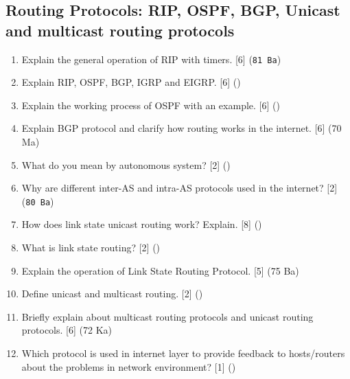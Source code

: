 \documentclass[12pt]{article}
\begin{document}
	\subsection{Routing Protocols: RIP, OSPF, BGP, Unicast and multicast routing protocols}
		\begin{enumerate}[noitemsep, topsep=0pt]
			\item Explain the general operation of RIP with timers. \hfill [6] (\texttt{81 Ba})

			\item Explain RIP, OSPF, BGP, IGRP and EIGRP. \hfill [6] ()

			\item Explain the working process of OSPF with an example. \hfill [6] ()

			\item Explain BGP protocol and clarify how routing works in the internet. \hfill [6] (70 Ma)

			\item What do you mean by autonomous system? \hfill [2] ()
			
			\item Why are different inter-AS and intra-AS protocols used in the internet? \hfill [2] (\texttt{80 Ba})

			\item How does link state unicast routing work? Explain. \hfill [8] ()

			\item What is link state routing? \hfill [2] ()

			\item Explain the operation of Link State Routing Protocol. \hfill [5] (75 Ba)
			\item Define unicast and
			 multicast routing. \hfill [2] ()

			\item Briefly explain about multicast routing protocols and unicast routing protocols. \hfill [6] (72 Ka)

			\item Which protocol is used in internet layer to provide feedback to hosts/routers about the problems in network environment? \hfill [1] ()
		\end{enumerate}
\end{document}
